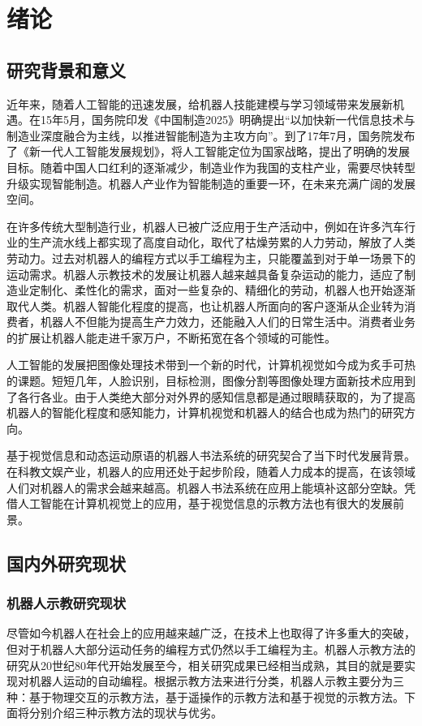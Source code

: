 \chapter{绪论}
\section{研究背景和意义}
近年来，随着人工智能的迅速发展，给机器人技能建模与学习领域带来发展新机遇。在15年5月，国务院印发《中国制造2025》明确提出“以加快新一代信息技术与制造业深度融合为主线，以推进智能制造为主攻方向”。到了17年7月，国务院发布了《新一代人工智能发展规划》，将人工智能定位为国家战略，提出了明确的发展目标\cite{Qin2019}。随着中国人口红利的逐渐减少，制造业作为我国的支柱产业，需要尽快转型升级实现智能制造。机器人产业作为智能制造的重要一环，在未来充满广阔的发展空间。

在许多传统大型制造行业，机器人已被广泛应用于生产活动中，例如在许多汽车行业的生产流水线上都实现了高度自动化，取代了枯燥劳累的人力劳动，解放了人类劳动力。过去对机器人的编程方式以手工编程为主，只能覆盖到对于单一场景下的运动需求。机器人示教技术的发展让机器人越来越具备复杂运动的能力，适应了制造业定制化、柔性化的需求，面对一些复杂的、精细化的劳动，机器人也开始逐渐取代人类。机器人智能化程度的提高，也让机器人所面向的客户逐渐从企业转为消费者，机器人不但能为提高生产力效力，还能融入人们的日常生活中。消费者业务的扩展让机器人能走进千家万户，不断拓宽在各个领域的可能性。

人工智能的发展把图像处理技术带到一个新的时代，计算机视觉如今成为炙手可热的课题。短短几年，人脸识别，目标检测，图像分割等图像处理方面新技术应用到了各行各业。由于人类绝大部分对外界的感知信息都是通过眼睛获取的，为了提高机器人的智能化程度和感知能力，计算机视觉和机器人的结合也成为热门的研究方向。

基于视觉信息和动态运动原语的机器人书法系统的研究契合了当下时代发展背景。在科教文娱产业，机器人的应用还处于起步阶段，随着人力成本的提高，在该领域人们对机器人的需求会越来越高。机器人书法系统在应用上能填补这部分空缺。凭借人工智能在计算机视觉上的应用，基于视觉信息的示教方法也有很大的发展前景。

\section{国内外研究现状}
\subsection{机器人示教研究现状}
尽管如今机器人在社会上的应用越来越广泛，在技术上也取得了许多重大的突破，但对于机器人大部分运动任务的编程方式仍然以手工编程为主。机器人示教方法的研究从20世纪80年代开始发展至今，相关研究成果已经相当成熟，其目的就是要实现对机器人运动的自动编程。根据示教方法来进行分类，机器人示教主要分为三种：基于物理交互的示教方法，基于遥操作的示教方法和基于视觉的示教方法。下面将分别介绍三种示教方法的现状与优劣。

